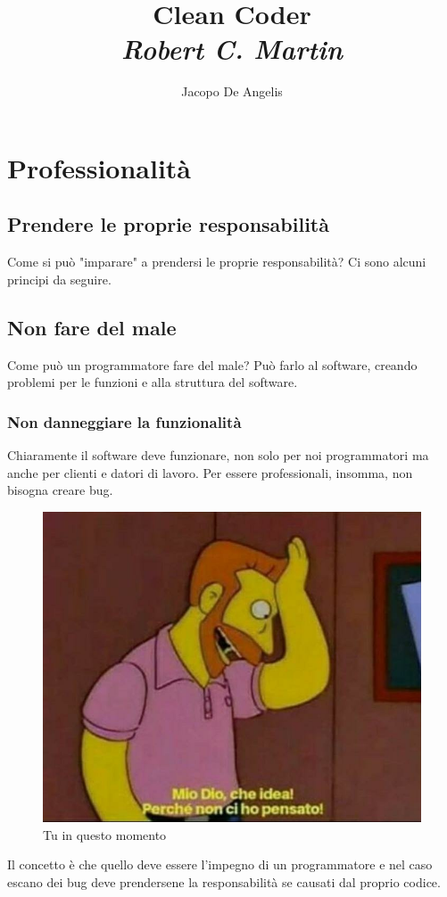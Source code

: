 \documentclass[11pt,a4paper]{book}
\begin{document}
\title{Clean Coder\\
\large{\textit{Robert C. Martin}}}
\author{Jacopo De Angelis}
\maketitle

\pagebreak
\tableofcontents
\pagebreak

\chapter{Professionalità}
\section{Prendere le proprie responsabilità}
Come si può "imparare" a prendersi le proprie responsabilità? Ci sono alcuni principi da seguire.

\section{Non fare del male}
Come può un programmatore fare del male? Può farlo al software, creando problemi per le funzioni e alla struttura del software.
\subsection{Non danneggiare la funzionalità}
Chiaramente il software deve funzionare, non solo per noi programmatori ma anche per clienti e datori di lavoro. Per essere professionali, insomma, non bisogna creare bug.
\begin{figure}[h!]
	\begin{center}
		\includegraphics[scale=0.3]{img/001.jpg}
		\caption{Tu in questo momento}
		\label{fig: 001}
	\end{center}
\end{figure}
Il concetto è che quello deve essere l'impegno di un programmatore e nel caso escano dei bug deve prendersene la responsabilità se causati dal proprio codice.
\end{document}
